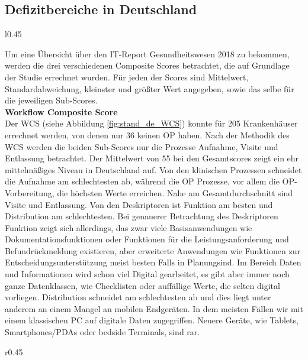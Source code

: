 \subsection{Defizitbereiche in Deutschland}
\label{sec:defizit_deutschland}
\begin{wrapfigure}{l}{0.45\textwidth}
	\caption{Workflow Composite Scores und Sub-Scores der deutschen Krankenhäuser 2017 \parencite[39]{huebner2019}}
	\label{fig:stand_de_WCS}
\end{wrapfigure}
Um eine Übersicht über den IT-Report Gesundheitswesen 2018 zu bekommen, werden die drei verschiedenen Composite Scores betrachtet, die auf Grundlage der Studie errechnet wurden. Für jeden der Scores sind Mittelwert, Standardabweichung, kleinster und größter Wert angegeben, sowie das selbe für die jeweiligen Sub-Scores.
\vspace{\parheadvspace}\\
\textbf{Workflow Composite Score}\\
Der WCS (siehe Abbildung \ref{fig:stand_de_WCS}) konnte für 205 Krankenhäuser errechnet werden, von denen nur 36 keinen OP haben. Nach der Methodik des WCS werden die beiden Sub-Scores nur die Prozesse Aufnahme, Visite und Entlassung betrachtet. Der Mittelwert von 55 bei den Gesamtscores zeigt ein ehr mittelmäßiges Niveau in Deutschland auf. Von den klinischen Prozessen schneidet die Aufnahme am schlechtesten ab, während die OP Prozesse, vor allem die OP-Vorbereitung, die höchsten Werte erreichen. Nahe am Gesamtdurchschnitt sind Visite und Entlassung. Von den Deskriptoren ist Funktion am besten und Distribution am schlechtesten. Bei genauerer Betrachtung des Deskriptoren Funktion zeigt sich allerdings, das zwar viele Basisanwendungen wie Dokumentationsfunktionen oder Funktionen für die Leistungsanforderung und Befundrückmeldung existieren, aber erweiterte Anwendungen wie Funktionen zur Entscheidungsunterstützung meist besten Falls \glqq in Planung\grqq{ }sind. Im Bereich Daten und Informationen wird schon viel Digital gearbeitet, es gibt aber immer noch ganze Datenklassen, wie Checklisten oder auffällige Werte, die selten digital vorliegen. Distribution schneidet am schlechtesten ab und dies liegt unter anderem an einem Mangel an mobilen Endgeräten. In dem meisten Fällen wir mit einem klassischen PC auf digitale Daten zugegriffen. Neuere Geräte, wie Tablets, Smartphones/PDAs oder bedside Terminals, sind rar. \parencite{huebner2019}
\begin{wrapfigure}{r}{0.45\textwidth}
	\caption{Mittelwert und Standardabweichung für den PIMCS und ICSS \parencite{huebner2019}}
	\label{fig:stand_de_PIMCS_ICCS}
\end{wrapfigure}
